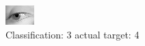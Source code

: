 \begin{figure}[h!]
\begin{center}
\includegraphics[width=0.60\columnwidth]{figures/ID2941_class_3_target_4.png}
\end{center}
\caption{ Classification: 3 actual target: 4}
\label{fig:ID2941_class_3_target_4}
\end{figure}
